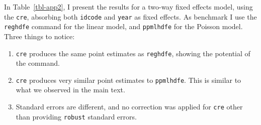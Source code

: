 \documentclass[bib]{statapress}
\providecommand{\tightlist}{%
  \setlength{\itemsep}{0pt}\setlength{\parskip}{0pt}}\usepackage{longtable,booktabs,array}
\begin{document}
In Table~\ref{tbl-app2}, I present the results for a two-way fixed
effects model, using the \texttt{cre}, absorbing both \texttt{idcode}
and \texttt{year} as fixed effects. As benchmark I use the
\texttt{reghdfe} command for the linear model, and \texttt{ppmlhdfe} for
the Poisson model. Three things to notice:

\begin{enumerate}
\def\labelenumi{\arabic{enumi}.}
\tightlist
\item
  \texttt{cre} produces the same point estimates as \texttt{reghdfe},
  showing the potential of the command.
\item
  \texttt{cre} produces very similar point estimates to
  \texttt{ppmlhdfe}. This is similar to what we observed in the main
  text.
\item
  Standard errors are different, and no correction was applied for
  \texttt{cre} other than providing \texttt{robust} standard errors.
\end{enumerate}
\end{document}
